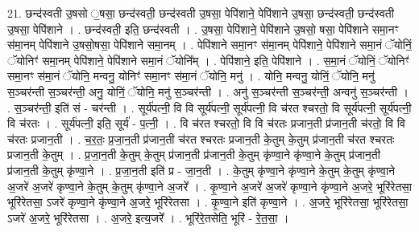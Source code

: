 \documentclass[17pt]{extarticle}
\begin{document}
21. छन्द॑स्वती उ॒षसो ॒षसा॒ छन्द॑स्वती॒ छन्द॑स्वती उ॒षसा॒ पेपि॑शाने॒ पेपि॑शाने उ॒षसा॒ छन्द॑स्वती॒ छन्द॑स्वती उ॒षसा॒ पेपि॑शाने । . छन्द॑स्वती॒ इति॒ छन्द॑स्वती । . उ॒षसा॒ पेपि॑शाने॒ पेपि॑शाने उ॒षसो॒ षसा॒ पेपि॑शाने समा॒नꣳ स॑मा॒नम् पेपि॑शाने उ॒षसो॒षसा॒ पेपि॑शाने समा॒नम् । . पेपि॑शाने समा॒नꣳ स॑मा॒नम् पेपि॑शाने॒ पेपि॑शाने समा॒नं ॅयोनिं॒ ॅयोनिꣳ॑ समा॒नम् पेपि॑शाने॒ पेपि॑शाने समा॒नं ॅयोनि᳚म् । . पेपि॑शाने॒ इति॒ पेपि॑शाने । . स॒मा॒नं ॅयोनिं॒ ॅयोनिꣳ॑ समा॒नꣳ स॑मा॒नं ॅयोनि॒ मन्वनु॒ योनिꣳ॑ समा॒नꣳ स॑मा॒नं ॅयोनि॒ मनु॑ । . योनि॒ मन्वनु॒ योनिं॒ ॅयोनि॒ मनु॑ स॒ञ्चर॑न्ती स॒ञ्चर॑न्ती॒ अनु॒ योनिं॒ ॅयोनि॒ मनु॑ स॒ञ्चर॑न्ती । . अनु॑ स॒ञ्चर॑न्ती स॒ञ्चर॑न्ती॒ अन्वनु॑ स॒ञ्चर॑न्ती । . स॒ञ्चर॑न्ती॒ इति॑ सं - चर॑न्ती । . सूर्य॑पत्नी॒ वि वि सूर्य॑पत्नी॒ सूर्य॑पत्नी॒ वि च॑रत श्चरतो॒ वि सूर्य॑पत्नी॒ सूर्य॑पत्नी॒ वि च॑रतः । . सूर्य॑पत्नी॒ इति॒ सूर्य॑ - प॒त्नी॒ । . वि च॑रत श्चरतो॒ वि वि च॑रतः प्रजान॒ती प्र॑जान॒ती च॑रतो॒ वि वि च॑रतः प्रजान॒ती । . च॒र॒तः॒ प्र॒जा॒न॒ती प्र॑जान॒ती च॑रत श्चरतः प्रजान॒ती के॒तुम् के॒तुम् प्र॑जान॒ती च॑रत श्चरतः प्रजान॒ती के॒तुम् । . प्र॒जा॒न॒ती के॒तुम् के॒तुम् प्र॑जान॒ती प्र॑जान॒ती के॒तुम् कृ॑ण्वा॒ने कृ॑ण्वा॒ने के॒तुम् प्र॑जान॒ती प्र॑जान॒ती के॒तुम् कृ॑ण्वा॒ने । . प्र॒जा॒न॒ती इति॑ प्र - जा॒न॒ती । . के॒तुम् कृ॑ण्वा॒ने कृ॑ण्वा॒ने के॒तुम् के॒तुम् कृ॑ण्वा॒ने अ॒जरे॑ अ॒जरे॑ कृण्वा॒ने के॒तुम् के॒तुम् कृ॑ण्वा॒ने अ॒जरे᳚ । . कृ॒ण्वा॒ने अ॒जरे॑ अ॒जरे॑ कृण्वा॒ने कृ॑ण्वा॒ने अ॒जरे॒ भूरि॑रेतसा॒ भूरि॑रेतसा॒ ऽजरे॑ कृण्वा॒ने कृ॑ण्वा॒ने अ॒जरे॒ भूरि॑रेतसा । . कृ॒ण्वा॒ने इति॑ कृण्वा॒ने । . अ॒जरे॒ भूरि॑रेतसा॒ भूरि॑रेतसा॒ ऽजरे॑ अ॒जरे॒ भूरि॑रेतसा । . अ॒जरे॒ इत्य॒जरे᳚ । . भूरि॑रे॒तसेति॒ भूरि॑ - रे॒त॒सा॒ । \newline
\end{document}
